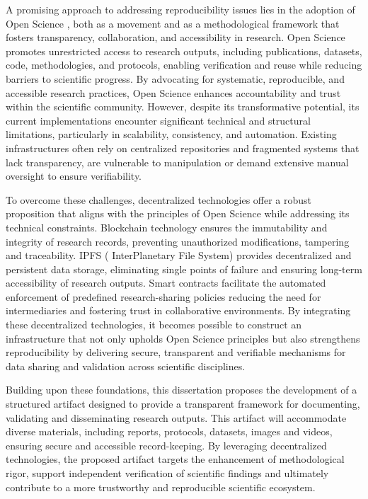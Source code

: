 \documentclass[final]{rc-book-2.14}
\begin{document}
A promising approach to addressing reproducibility issues lies in the adoption of Open Science \cite{foster_open_2017}, both as a movement and as a methodological framework that fosters transparency, collaboration, and accessibility in research. Open Science promotes unrestricted access to research outputs, including publications, datasets, code, methodologies, and protocols, enabling verification and reuse while reducing barriers to scientific progress. By advocating for systematic, reproducible, and accessible research practices, Open Science enhances accountability and trust within the scientific community. However, despite its transformative potential, its current implementations encounter significant technical and structural limitations, particularly in scalability, consistency, and automation. Existing infrastructures often rely on centralized repositories and fragmented systems that lack transparency, are vulnerable to manipulation or demand extensive manual oversight to ensure verifiability.

To overcome these challenges, decentralized technologies offer a robust proposition that aligns with the principles of Open Science while addressing its technical constraints. Blockchain technology ensures the immutability and integrity of research records, preventing unauthorized modifications, tampering and traceability. IPFS ( InterPlanetary File System) provides decentralized and persistent data storage, eliminating single points of failure and ensuring long-term accessibility of research outputs. Smart contracts facilitate the automated enforcement of predefined research-sharing policies reducing the need for intermediaries and fostering trust in collaborative environments. By integrating these decentralized technologies, it becomes possible to construct an infrastructure that not only upholds Open Science principles but also strengthens reproducibility by delivering secure, transparent and verifiable mechanisms for data sharing and validation across scientific disciplines.

Building upon these foundations, this dissertation proposes the development of a structured artifact designed to provide a transparent framework for documenting, validating and disseminating research outputs. This artifact will accommodate diverse materials, including reports, protocols, datasets, images and videos, ensuring secure and accessible record-keeping. By leveraging decentralized technologies, the proposed artifact targets the enhancement of methodological rigor, support independent verification of scientific findings and ultimately contribute to a more trustworthy and reproducible scientific ecosystem.
\end{document}
